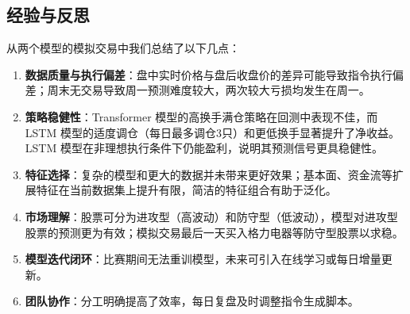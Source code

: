\documentclass[12pt,a4paper]{ctexart}
\begin{document}
	\subsection{经验与反思}
	从两个模型的模拟交易中我们总结了以下几点：
	\begin{enumerate}
		\item \textbf{数据质量与执行偏差}：盘中实时价格与盘后收盘价的差异可能导致指令执行偏差；周末无交易导致周一预测难度较大，两次较大亏损均发生在周一。
		\item \textbf{策略稳健性}：Transformer 模型的高换手满仓策略在回测中表现不佳，而 LSTM 模型的适度调仓（每日最多调仓3只）和更低换手显著提升了净收益。LSTM 模型在非理想执行条件下仍能盈利，说明其预测信号更具稳健性。
		\item \textbf{特征选择}：复杂的模型和更大的数据并未带来更好效果；基本面、资金流等扩展特征在当前数据集上提升有限，简洁的特征组合有助于泛化。
		\item \textbf{市场理解}：股票可分为进攻型（高波动）和防守型（低波动），模型对进攻型股票的预测更为有效；模拟交易最后一天买入格力电器等防守型股票以求稳。
		\item \textbf{模型迭代闭环}：比赛期间无法重训模型，未来可引入在线学习或每日增量更新。
		\item \textbf{团队协作}：分工明确提高了效率，每日复盘及时调整指令生成脚本。
	\end{enumerate}
	
\end{document}
